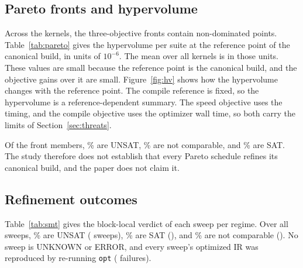 


\subsection{Pareto fronts and hypervolume}

Across the \NumKernels{} kernels, the three-objective fronts contain \ParetoPoints{} non-dominated points. Table~\ref{tab:pareto}
gives the hypervolume per suite at the reference point of the canonical build, in units of $10^{-6}$. The mean over all kernels is
\MeanHypervolumeMicro{} in those units. These values are small because the reference point is the canonical build, and the
objective gains over it are small. Figure~\ref{fig:hv} shows how the hypervolume changes with the reference point. The compile reference is fixed, so the hypervolume is a reference-dependent summary. The speed
objective uses the timing, and the compile objective uses the optimizer wall time, so both carry the limits of
Section~\ref{sec:threats}.




Of the \ParetoPoints{} front members, \ParetoMemberUnsatPct{}\% are UNSAT, \ParetoMemberNotComparablePct{}\% are not comparable,
and \ParetoMemberSatPct{}\% are SAT. The study therefore does not establish that every Pareto schedule refines its canonical
build, and the paper does not claim it.

\subsection{Refinement outcomes}
\label{sec:results-refinement}

Table~\ref{tab:smt} gives the block-local verdict of each sweep per regime. Over all sweeps, \SmtUnsatPct{}\% are UNSAT
(\SmtUnsatCount{} sweeps), \SmtSatPct{}\% are SAT (\SmtSatCount{}), and \SmtNotComparablePct{}\% are not comparable
(\SmtNotComparableCount{}). No sweep is UNKNOWN or ERROR, and every sweep's optimized IR was reproduced by re-running \texttt{opt}
(\SmtIrNotReproducedCount{} failures).


